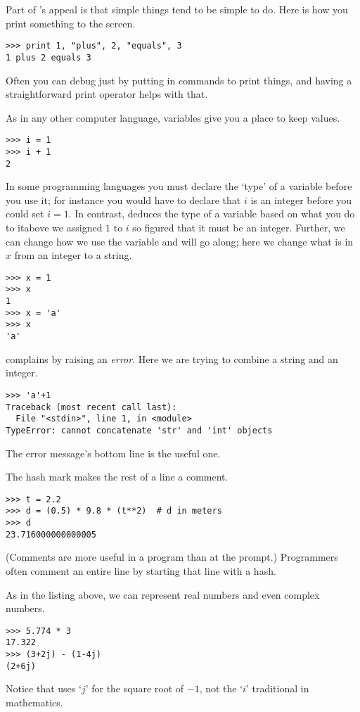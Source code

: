 Part of \python's appeal is that simple things tend to be simple to do.
Here is how you print something to the screen.
\begin{lstlisting}[style=python]
>>> print 1, "plus", 2, "equals", 3
1 plus 2 equals 3
\end{lstlisting}
Often you can debug just by putting in commands to print things, 
and having a straightforward print operator helps with that. 

As in any other computer language, variables give you a place to keep values.
\begin{lstlisting}[style=python]
>>> i = 1
>>> i + 1
2
\end{lstlisting}
In some programming languages you must declare the `type' of a variable
before you use it; for instance you would have to declare 
that $i$ is an integer before you could set $i=1$.
In contrast, \python{} deduces the type of a variable 
based on what you do to it\Dash above we assigned $1$ to $i$ 
so \python{} figured that it must be an integer.
Further, we can change how we use the variable and \python{} will 
go along; here we change what is in $x$ from an integer to a string.
\begin{lstlisting}[style=python]
>>> x = 1
>>> x
1
>>> x = 'a'
>>> x
'a'
\end{lstlisting}

\python{} complains by raising an \textit{error}.
Here we are trying to combine a string and an integer. 
\begin{lstlisting}[style=python]
>>> 'a'+1
Traceback (most recent call last):
  File "<stdin>", line 1, in <module>
TypeError: cannot concatenate 'str' and 'int' objects
\end{lstlisting}
The error message's bottom line is the useful one.

The hash mark \inlinecode{\#} makes the rest of a line a comment.
\begin{lstlisting}[style=python]
>>> t = 2.2
>>> d = (0.5) * 9.8 * (t**2)  # d in meters
>>> d
23.716000000000005
\end{lstlisting}
(Comments are more useful in a program than at the prompt.)
Programmers often comment an entire line by starting 
that line with a hash. 

As in the listing above, we can represent real 
numbers 
and even complex numbers.
\begin{lstlisting}[style=python]
>>> 5.774 * 3
17.322
>>> (3+2j) - (1-4j)
(2+6j)
\end{lstlisting}
Notice that \python{} uses `$j$' for the square
root of $-1$, not the `$i$' traditional in mathematics.

